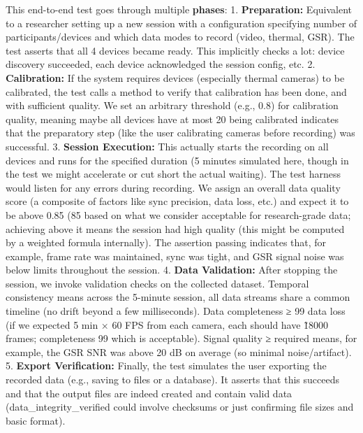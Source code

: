 \documentclass[11pt,a4paper]{report}
\begin{document}
This end-to-end test goes through multiple \textbf{phases}: 1.
\textbf{Preparation:} Equivalent to a researcher setting up a new session
with a configuration specifying number of participants/devices and which
data modes to record (video, thermal, GSR). The test asserts that all 4
devices became ready. This implicitly checks a lot: device discovery
succeeded, each device acknowledged the session config, etc. 2.
\textbf{Calibration:} If the system requires devices (especially thermal
cameras) to be calibrated, the test calls a method to verify that
calibration has been done, and with sufficient quality. We set an
arbitrary threshold (e.g., 0.8) for calibration quality, meaning maybe
all devices have at most 20%
being calibrated indicates that the preparatory step (like the user
calibrating cameras before recording) was successful. 3. \textbf{Session
Execution:} This actually starts the recording on all devices and runs
for the specified duration (5 minutes simulated here, though in the test
we might accelerate or cut short the actual waiting). The test harness
would listen for any errors during recording. We assign an overall data
quality score (a composite of factors like sync precision, data loss,
etc.) and expect it to be above 0.85 (85%
based on what we consider acceptable for research-grade data; achieving
above it means the session had high quality (this might be computed by a
weighted formula internally). The assertion passing indicates that, for
example, frame rate was maintained, sync was tight, and GSR signal noise
was below limits throughout the session. 4. \textbf{Data Validation:} After
stopping the session, we invoke validation checks on the collected
dataset. Temporal consistency means across the 5-minute session, all
data streams share a common timeline (no drift beyond a few
milliseconds). Data completeness ≥ 99%
data loss (if we expected 5 min × 60 FPS from each camera, each should
have \~18000 frames; completeness 99%
which is acceptable). Signal quality ≥ required means, for example, the
GSR SNR was above 20 dB on average (so minimal noise/artifact). 5.
\textbf{Export Verification:} Finally, the test simulates the user exporting
the recorded data (e.g., saving to files or a database). It asserts that
this succeeds and that the output files are indeed created and contain
valid data (data\_integrity\_verified could involve checksums or just
confirming file sizes and basic format).
\end{document}
